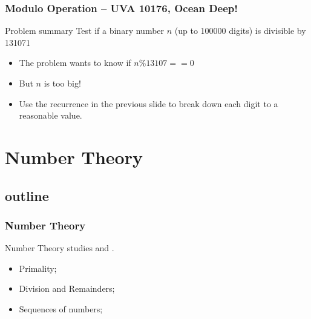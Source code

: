 \begin{frame}
  \frametitle{Modulo Operation -- UVA 10176, Ocean Deep!}
  {\smaller
  \begin{block}{Problem summary}
    Test if a binary number $n$ (up to 100000 digits) is divisible by 131071
  \end{block}

  \begin{itemize}
  \item The problem wants to know if $n\%13107 == 0$
  \item But $n$ is too big!

  \item Use the recurrence in the previous slide to break down each
    digit to a reasonable value.
  \end{itemize}}

\end{frame}


\section{Number Theory}
\subsection{outline}
\begin{frame}
  \frametitle{Number Theory} {\small

    Number Theory studies  and
    .

    \bigskip

    \begin{itemize}
    \item Primality;
    \item Division and Remainders;
    \item Sequences of numbers;
    \end{itemize}

    }
\end{frame}

